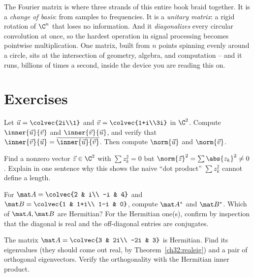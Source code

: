 \begin{aestheticbox}
The Fourier matrix is where three strands of this entire book braid together. It is
a \emph{change of basis}: from samples to frequencies. It is a \emph{unitary
matrix}: a rigid rotation of $\C^n$ that loses no information. And it
\emph{diagonalizes} every circular convolution at once, so the hardest operation in
signal processing becomes pointwise multiplication. One matrix, built from $n$
points spinning evenly around a circle, sits at the intersection of geometry,
algebra, and computation -- and it runs, billions of times a second, inside the
device you are reading this on.
\end{aestheticbox}

\section{Exercises}

\begin{exercise}\label{ch32:ex-innerprod}
Let $\vec u=\colvec{2i\\1}$ and $\vec v=\colvec{1+i\\3i}$ in $\C^2$. Compute
$\inner{\vec u}{\vec v}$ and $\inner{\vec v}{\vec u}$, and verify that
$\inner{\vec v}{\vec u}=\overline{\inner{\vec u}{\vec v}}$. Then compute
$\norm{\vec u}$ and $\norm{\vec v}$.
\end{exercise}

\begin{exercise}\label{ch32:ex-naivefail}
Find a nonzero vector $\vec z\in\C^2$ with $\sum z_k^2 = 0$ but
$\norm{\vec z}^2=\sum\abs{z_k}^2 \ne 0$. Explain in one sentence why this shows the
naive ``dot product'' $\sum z_k^2$ cannot define a length.
\end{exercise}

\begin{exercise}\label{ch32:ex-star}
For $\mat A=\colvec{2 & i\\ -i & 4}$ and $\mat B=\colvec{1 & 1+i\\ 1-i & 0}$,
compute $\mat A^{*}$ and $\mat B^{*}$. Which of $\mat A,\mat B$ are Hermitian?
For the Hermitian one(s), confirm by inspection that the diagonal is real and the
off-diagonal entries are conjugates.
\end{exercise}

\begin{exercise}\label{ch32:ex-hermeig}
The matrix $\mat A=\colvec{3 & 2i\\ -2i & 3}$ is Hermitian. Find its eigenvalues
(they should come out real, by Theorem~\ref{ch32:realeig}) and a pair of orthogonal
eigenvectors. Verify the orthogonality with the Hermitian inner product.
\end{exercise}

